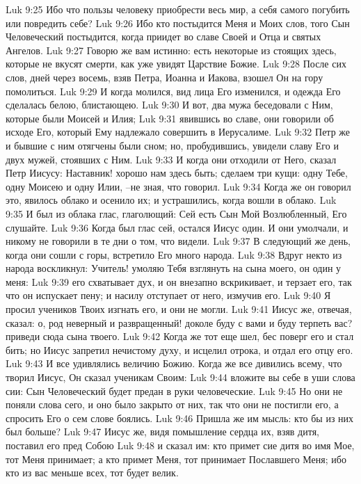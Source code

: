 Luk 9:25  Ибо что пользы человеку приобрести весь мир, а себя самого погубить или повредить себе?
Luk 9:26  Ибо кто постыдится Меня и Моих слов, того Сын Человеческий постыдится, когда приидет во славе Своей и Отца и святых Ангелов.
Luk 9:27  Говорю же вам истинно: есть некоторые из стоящих здесь, которые не вкусят смерти, как уже увидят Царствие Божие.
Luk 9:28  После сих слов, дней через восемь, взяв Петра, Иоанна и Иакова, взошел Он на гору помолиться.
Luk 9:29  И когда молился, вид лица Его изменился, и одежда Его сделалась белою, блистающею.
Luk 9:30  И вот, два мужа беседовали с Ним, которые были Моисей и Илия;
Luk 9:31  явившись во славе, они говорили об исходе Его, который Ему надлежало совершить в Иерусалиме.
Luk 9:32  Петр же и бывшие с ним отягчены были сном; но, пробудившись, увидели славу Его и двух мужей, стоявших с Ним.
Luk 9:33  И когда они отходили от Него, сказал Петр Иисусу: Наставник! хорошо нам здесь быть; сделаем три кущи: одну Тебе, одну Моисею и одну Илии, --не зная, что говорил.
Luk 9:34  Когда же он говорил это, явилось облако и осенило их; и устрашились, когда вошли в облако.
Luk 9:35  И был из облака глас, глаголющий: Сей есть Сын Мой Возлюбленный, Его слушайте.
Luk 9:36  Когда был глас сей, остался Иисус один. И они умолчали, и никому не говорили в те дни о том, что видели.
Luk 9:37  В следующий же день, когда они сошли с горы, встретило Его много народа.
Luk 9:38  Вдруг некто из народа воскликнул: Учитель! умоляю Тебя взглянуть на сына моего, он один у меня:
Luk 9:39  его схватывает дух, и он внезапно вскрикивает, и терзает его, так что он испускает пену; и насилу отступает от него, измучив его.
Luk 9:40  Я просил учеников Твоих изгнать его, и они не могли.
Luk 9:41  Иисус же, отвечая, сказал: о, род неверный и развращенный! доколе буду с вами и буду терпеть вас? приведи сюда сына твоего.
Luk 9:42  Когда же тот еще шел, бес поверг его и стал бить; но Иисус запретил нечистому духу, и исцелил отрока, и отдал его отцу его.
Luk 9:43  И все удивлялись величию Божию. Когда же все дивились всему, что творил Иисус, Он сказал ученикам Своим:
Luk 9:44  вложите вы себе в уши слова сии: Сын Человеческий будет предан в руки человеческие.
Luk 9:45  Но они не поняли слова сего, и оно было закрыто от них, так что они не постигли его, а спросить Его о сем слове боялись.
Luk 9:46  Пришла же им мысль: кто бы из них был больше?
Luk 9:47  Иисус же, видя помышление сердца их, взяв дитя, поставил его пред Собою
Luk 9:48  и сказал им: кто примет сие дитя во имя Мое, тот Меня принимает; а кто примет Меня, тот принимает Пославшего Меня; ибо кто из вас меньше всех, тот будет велик.

